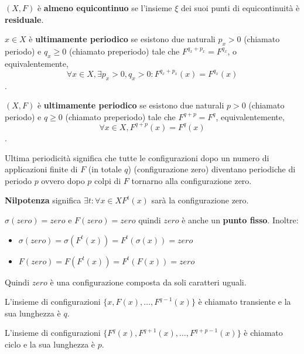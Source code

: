 \begin{definizione}
    $(X,F)$ è \textbf{almeno equicontinuo} se l'insieme $\xi$ dei suoi punti di
    equicontinuità è \textbf{residuale}.
\end{definizione}
\begin{definizione}
    $x\in X $ è \textbf{ultimamente periodico} se esistono due naturali $p_x>0$ (chiamato
    periodo) e $q_x\ge 0$ (chiamato preperiodo) tale che $F^{q_x+p_x} = F^{q_x}$, o
    equivalentemente,
    $$\forall x\in X,\exists p_x>0,q_x>0:F^{q_x+p_x}(x) = F^{q_x}(x)$$.
\end{definizione}
\begin{definizione}
    $(X,F)$ è \textbf{ultimamente periodico} se esistono due naturali $p>0$ (chiamato
    periodo) e $q\ge 0$ (chiamato preperiodo) tale che $F^{q+p} = F^q$, equivalentemente,
    $$\forall x\in X,F^{q+p}(x) = F^q(x)$$.
\end{definizione}
Ultima periodicità significa che tutte le configurazioni dopo un numero di applicazioni
finite di $F$ (in totale $q$) (configurazione zero) diventano periodiche di periodo $p$ ovvero dopo
$p$ colpi di $F$ tornarno alla configurazione zero.

\begin{definizione} 
    \textbf{Nilpotenza} significa $\exists t:\forall x\in X$$F^t(x)$ sarà la configurazione
    zero.
\end{definizione}

\begin{nota}
    $\sigma(zero) = zero$ e $F(zero) = zero$ quindi $zero$ è anche un \textbf{punto fisso}.
    Inoltre:
    \begin{itemize}
        \item $\sigma(zero) = \sigma(F^t(x)) = F^t(\sigma(x)) = zero$
        \item $F(zero) = F(F^t(x)) = F^t(F(x)) = zero$
    \end{itemize}
    Quindi $zero$ è una configurazione composta da soli caratteri uguali.
\end{nota}

L'insieme di configurazioni $\{x,F(x), \dots, F^{q-1}(x)\}$ è chiamato transiente
e la sua lunghezza è $q$.

L'insieme di configurazioni $\{F^q(x), F^{q+1}(x), \dots, F^{q+p-1}(x)\}$ è chiamato ciclo
e la sua lunghezza è $p$.

